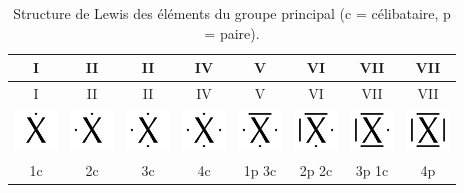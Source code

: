 \documentclass[
  11pt,
  french,
  a4paper,
  openany]{book}
\begin{document}
\begin{longtable}[]{@{}cccccccc@{}}
\caption{\label{tab:structure-lewis-groupe-principal} Structure de Lewis des éléments du groupe principal (c = célibataire, p = paire).}\tabularnewline
\toprule
I & II & II & IV & V & VI & VII & VII\tabularnewline
\midrule
\endfirsthead
\toprule
I & II & II & IV & V & VI & VII & VII\tabularnewline
\midrule
\endhead
\includegraphics[width=3em,height=\textheight]{images/lewis-dots-1c.png} & \includegraphics[width=3em,height=\textheight]{images/lewis-dots-2c.png} & \includegraphics[width=3em,height=\textheight]{images/lewis-dots-3c.png} & \includegraphics[width=3em,height=\textheight]{images/lewis-dots-4c.png} & \includegraphics[width=3em,height=\textheight]{images/lewis-dots-1p3c.png} & \includegraphics[width=3em,height=\textheight]{images/lewis-dots-2p2c.png} & \includegraphics[width=3em,height=\textheight]{images/lewis-dots-3p1c.png} & \includegraphics[width=3em,height=\textheight]{images/lewis-dots-4p.png}\tabularnewline
1c & 2c & 3c & 4c & 1p 3c & 2p 2c & 3p 1c & 4p\tabularnewline
\bottomrule
\end{longtable}

\newpage
\end{document}
